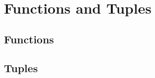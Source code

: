 \section{Functions and Tuples}
\label{sec:library}







\subsection{Functions}






\subsection{Tuples}




